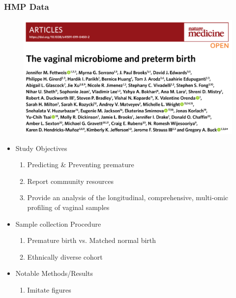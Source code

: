 \documentclass{beamer}
\begin{document}
    \begin{frame}[allowframebreaks]
        \frametitle{HMP Data \protect \cite{validate2}}

        \begin{figure}
            \includegraphics[width=0.8 \linewidth]{figures/Literature/HMP/title.png}
        \end{figure}
        \newpage

        \begin{itemize}
            \item Study Objectives
            \begin{enumerate}
                \item Predicting \& Preventing premature
                \item Report community resources
                \item Provide an analysis of the longitudinal, comprehensive, multi-omic profiling of vaginal samples
            \end{enumerate}

            \item Sample collection Procedure
            \begin{enumerate}
                \item Premature birth vs. Matched normal birth
                \item Ethnically diverse cohort
            \end{enumerate}

            \item Notable Methods/Results
            \begin{enumerate}
                \item Imitate figures
            \end{enumerate}
        \end{itemize}


\end{frame}
\end{document}
